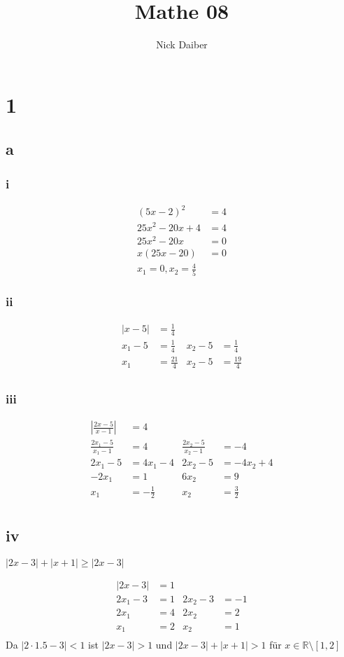 \documentclass{article}
\author{Nick Daiber}
\title{Mathe 08}
\begin{document}
\maketitle
\section*{1}
\subsection*{a}
\subsubsection*{i}
\begin{align*}
    (5x-2)^2&=4\\
    25x^2-20x+4&=4\\
    25x^2-20x&=0\\
    x(25x-20)&=0\\
    x_1=0,x_2=\frac{4}{5}
\end{align*}
\subsubsection*{ii}
\begin{align*}
    |x-5|&=\frac{1}{4}\\
    x_1-5&=\frac{1}{4}&x_2-5&=\frac{1}{4}\\
    x_1&=\frac{21}{4}&x_2-5&=\frac{19}{4}\\
\end{align*}
\subsubsection*{iii}
\begin{align*}
    |\frac{2x-5}{x-1}|&=4\\
    \frac{2x_1-5}{x_1-1}&=4&
    \frac{2x_2-5}{x_2-1}&=-4\\
    2x_1-5&=4x_1-4&
    2x_2-5&=-4x_2+4\\
    -2x_1&=1&
    6x_2&=9\\
    x_1&=-\frac{1}{2}&
    x_2&=\frac{3}{2}\\
\end{align*}
\subsection*{iv}
$|2x-3|+|x+1|\geq |2x-3|$

\begin{align*}
    |2x-3|&=1\\
    2x_1-3&=1&
    2x_2-3&=-1\\
    2x_1&=4&
    2x_2&=2\\
    x_1&=2&
    x_2&=1\\
\end{align*}
Da $|2\cdot 1.5-3|< 1$ ist $|2x-3|>1$ und $|2x-3|+|x+1|>1$ für
$x\in\mathbb R\setminus [1,2]$
\end{document}
